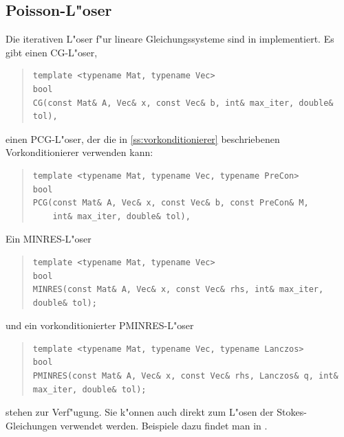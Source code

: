 \documentclass[11pt,a4paper]{article}
\newenvironment{Code}{\begin{quote}\scriptsize}{\end{quote}}
\begin{document}
\subsection{Poisson-L"oser}
Die iterativen L"oser f"ur lineare Gleichungssysteme sind in
 implementiert.  Es gibt einen CG-L"oser,
\begin{Code}
\begin{verbatim}
template <typename Mat, typename Vec>
bool
CG(const Mat& A, Vec& x, const Vec& b, int& max_iter, double& tol),
\end{verbatim}
\end{Code}
einen PCG-L"oser, der die in \ref{ss:vorkonditionierer} beschriebenen Vorkonditionierer
verwenden kann:
\begin{Code}
\begin{verbatim}
template <typename Mat, typename Vec, typename PreCon>
bool
PCG(const Mat& A, Vec& x, const Vec& b, const PreCon& M,
    int& max_iter, double& tol),
\end{verbatim}
\end{Code}
Ein MINRES-L"oser
\begin{Code}
\begin{verbatim}
template <typename Mat, typename Vec>
bool
MINRES(const Mat& A, Vec& x, const Vec& rhs, int& max_iter, double& tol);
\end{verbatim}
\end{Code}
und ein vorkonditionierter PMINRES-L"oser
\begin{Code}
\begin{verbatim}
template <typename Mat, typename Vec, typename Lanczos>
bool
PMINRES(const Mat& A, Vec& x, const Vec& rhs, Lanczos& q, int& max_iter, double& tol);
\end{verbatim}
\end{Code}
stehen zur Verf"ugung. Sie k"onnen auch direkt
zum L"osen der Stokes-Gleichungen verwendet werden. Beispiele dazu findet man in
.
\end{document}
